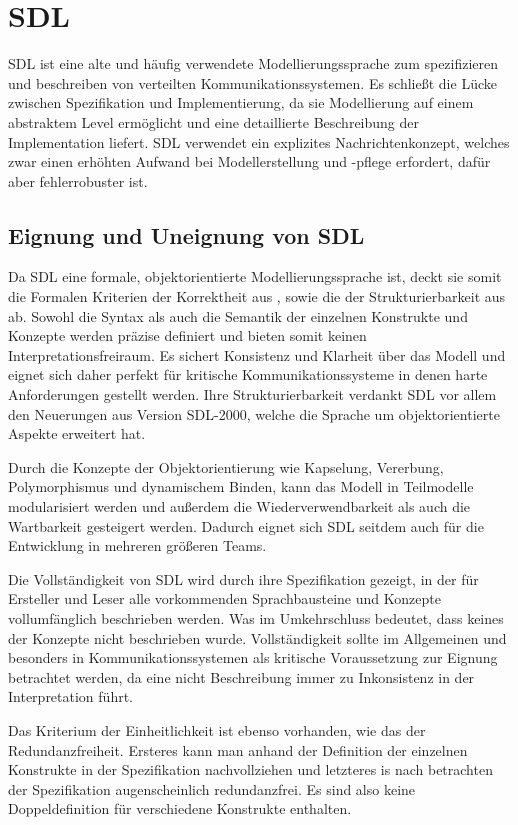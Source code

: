 \section{SDL}
\label{sc:SDLB}
\ac{SDL} ist eine alte und häufig verwendete Modellierungssprache zum spezifizieren und beschreiben von verteilten Kommunikationssystemen. 
Es schließt die Lücke zwischen Spezifikation und Implementierung, da sie Modellierung auf einem abstraktem Level ermöglicht und eine detaillierte Beschreibung der Implementation liefert. \ac{SDL} verwendet ein  explizites  Nachrichtenkonzept,  welches  zwar  einen  erhöhten  Aufwand  bei  Modellerstellung und -pflege erfordert, dafür aber fehlerrobuster ist. 
\subsection{Eignung und Uneignung von SDL}
\label{ssc:SDL_Eignung}
Da \ac{SDL} eine formale, objektorientierte Modellierungssprache ist, deckt sie somit die Formalen Kriterien der Korrektheit aus \pageref{ssc:Korrektheit}, sowie die der Strukturierbarkeit aus \pageref{ssc:Strukturierbarkeit} ab. Sowohl die Syntax als auch die Semantik der einzelnen Konstrukte und Konzepte werden präzise definiert und bieten somit keinen Interpretationsfreiraum. Es sichert Konsistenz und Klarheit über das Modell und eignet sich daher perfekt für kritische Kommunikationssysteme in denen harte Anforderungen gestellt werden. Ihre Strukturierbarkeit verdankt \ac{SDL} vor allem den Neuerungen aus Version \ac{SDL}-2000, welche die Sprache um objektorientierte Aspekte erweitert hat.

Durch die Konzepte der Objektorientierung wie Kapselung, Vererbung, Polymorphismus und dynamischem Binden, kann das Modell in Teilmodelle modularisiert werden und außerdem die Wiederverwendbarkeit als auch die Wartbarkeit gesteigert werden. Dadurch eignet sich \ac{SDL} seitdem auch für die Entwicklung in mehreren größeren Teams. 

Die Vollständigkeit von \ac{SDL} wird durch ihre Spezifikation gezeigt, in der für Ersteller und Leser alle vorkommenden Sprachbausteine und Konzepte vollumfänglich beschrieben werden. Was im Umkehrschluss bedeutet, dass keines der Konzepte nicht beschrieben wurde. Vollständigkeit sollte im Allgemeinen und besonders in Kommunikationssystemen als kritische Voraussetzung zur Eignung betrachtet werden, da eine nicht Beschreibung immer zu Inkonsistenz in der Interpretation führt.

Das Kriterium der Einheitlichkeit ist ebenso vorhanden, wie das der Redundanzfreiheit. Ersteres kann man anhand der Definition der einzelnen Konstrukte in der Spezifikation nachvollziehen und letzteres is nach betrachten der Spezifikation augenscheinlich redundanzfrei. Es sind also keine Doppeldefinition für verschiedene Konstrukte enthalten. 


